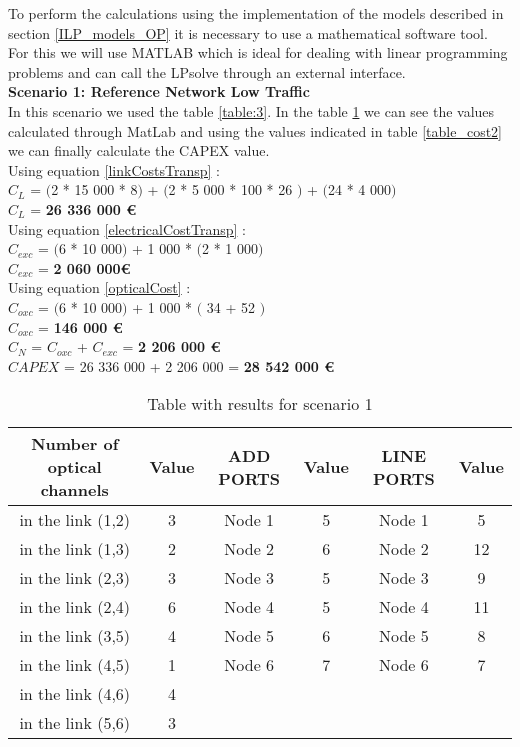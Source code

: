 To perform the calculations using the implementation of the models described in section \ref{ILP_models_OP} it is necessary to use a mathematical software tool. For this we will use MATLAB which is ideal for dealing with linear programming problems and can call the LPsolve through an external interface. \\

\textbf{Scenario 1: Reference Network Low Traffic} \label{Scenario1_transp} \\

In this scenario we used the table \ref{table:3}. In the table \ref{result_ILP1_T} we can see the values calculated through MatLab and using the values indicated in table \ref{table_cost2} we can finally calculate the CAPEX value. \\

Using equation \ref{linkCostsTransp} : \\
$C_L$ = $($2 * 15 000 * 8$)$ + $($2 * 5 000 * 100 * 26 $)$ + $($24 * 4 000$)$ \\
$C_L$ = \textbf{26 336 000 \euro} \\

Using equation \ref{electricalCostTransp} : \\
$C_{exc}$ = $($6 * 10 000$)$ + 1 000 * $($2 * 1 000$)$ \\
$C_{exc}$ = \textbf{2 060 000\euro} \\

Using equation \ref{opticalCost} : \\
$C_{oxc}$ = $($6 * 10 000$)$ + 1 000 * $($ 34 + 52 $)$ \\
$C_{oxc}$ = \textbf{146 000 \euro} \\
$C_N$ = $C_{oxc}$ + $C_{exc}$ = \textbf{2 206 000 \euro} \\

$CAPEX$ = 26 336 000 + 2 206 000 = \textbf{28 542 000 \euro}\\

\begin{table}[h!]
\centering
\begin{tabular}{|| c | c || c | c || c | c ||}
 \hline
 Number of optical channels & Value & ADD PORTS & Value & LINE PORTS & Value \\
 \hline\hline
 in the link (1,2) & 3 & Node 1 & 5 & Node 1 & 5 \\
 in the link (1,3) & 2 & Node 2 & 6 & Node 2 & 12 \\
 in the link (2,3) & 3 & Node 3 & 5 & Node 3 & 9 \\
 in the link (2,4) & 6 & Node 4 & 5 & Node 4 & 11 \\
 in the link (3,5) & 4 & Node 5 & 6 & Node 5 & 8 \\
 in the link (4,5) & 1 & Node 6 & 7 & Node 6 & 7 \\
 in the link (4,6) & 4 & & & & \\
 in the link (5,6) & 3 & & & & \\
 \hline
\end{tabular}
\caption{Table with results for scenario 1}
\label{result_ILP1_T}
\end{table}



